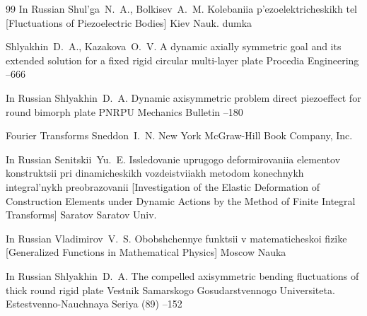 \begin{thebibliography}{99}
\lang In Russian
\by Shul'ga~N.~A., Bolkisev~A.~M.
\book Kolebaniia p'ezoelektricheskikh tel \rm [Fluctuations of Piezoelectric Bodies]
\publaddr Kiev
\publ Nauk. dumka


\by Shlyakhin~D.~A., Kazakova~O.~V.
\paper A dynamic axially symmetric goal and its  extended solution for a fixed rigid circular multi-layer plate
\jour Procedia Engineering
--666

\lang In Russian
\by Shlyakhin~D.~A.
\paper Dynamic axisymmetric problem direct piezoeffect for round bimorph plate
\jour PNRPU Mechanics Bulletin
--180

\book Fourier Transforms
\by Sneddon~I.~N. 
\publaddr New York
\publ McGraw-Hill Book Company, Inc.

\lang In Russian
\by Senitskii~Yu.~E.
\book Issledovanie uprugogo deformirovaniia elementov konstruktsii pri dinamicheskikh vozdeistviiakh metodom konechnykh integral'nykh preobrazovanii \rm [Investigation of the Elastic Deformation of Construction Elements under Dynamic Actions by the Method of Finite Integral Transforms]
\publaddr Saratov
\publ Saratov Univ.



\lang In Russian
\by Vladimirov~V.~S.
\book Obobshchennye funktsii v matematicheskoi fizike \rm [Generalized Functions in Mathematical Physics]
\publaddr Moscow
\publ Nauka



\lang In Russian
\by Shlyakhin~D.~A.
\paper The compelled axisymmetric bending fluctuations of thick round rigid plate
\jour Vestnik Samarskogo Gosudarstvennogo Universiteta. Estestvenno-Nauchnaya Seriya
(89)
--152


\end{thebibliography}

\renewcommand{\baselinestretch}{0.9}

%

